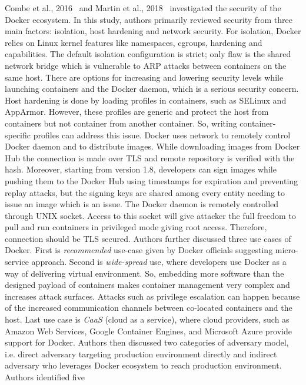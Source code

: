 Combe et al., 2016~\cite{combe2016docker} and Martin et al., 2018~\cite{martin2018docker} 
investigated the security of
the Docker ecosystem. In this study, authors primarily reviewed security
from three main factors: isolation, host hardening and network security. 
For isolation, 
Docker relies on Linux kernel features like namespaces, cgroups, 
hardening and capabilities. The default isolation configuration 
is strict; only flaw is the shared network bridge which is 
vulnerable to ARP attacks between containers on the same host. 
There are options for increasing and lowering security levels 
while launching containers and the Docker daemon, 
which is a serious security concern. Host hardening is done by 
loading profiles in containers, such as SELinux and AppArmor. 
However, these profiles are generic and protect the 
host from containers but not container from another container. So, writing 
container-specific profiles can address this issue. Docker uses network 
to remotely control Docker daemon and to distribute images. 
While downloading images from Docker Hub the connection is made over TLS 
and remote repository is verified with the hash. Moreover, starting from version 
1.8, developers can sign images while pushing them to the Docker Hub using 
timestamps for expiration and preventing replay attacks, but the signing keys 
are shared among every entity needing to issue an image which is an issue. 
The Docker daemon is remotely controlled through UNIX socket. Access to this 
socket will give attacker the full freedom to pull and run containers in 
privileged mode giving root access. Therefore, connection should be 
TLS secured.
Authors further discussed three use cases of Docker. First is \textit{recommended} 
use-case given by Docker officials suggesting micro-service approach. Second 
is \textit{wide-spread} use, where developers use Docker as a way of delivering virtual 
environment. So, embedding more software than the designed payload of containers 
makes container management very complex and increases attack surfaces. Attacks such as 
privilege escalation can happen because of the increased communication 
channels between co-located containers and the host. Last use case is \textit{CaaS} (cloud as a 
service), where cloud providers, such as Amazon Web Services, Google Container
Engines, and Microsoft Azure provide support for Docker. 
Authors then discussed two categories of adversary model, i.e. direct adversary 
targeting production environment directly and indirect adversary who leverages 
Docker ecosystem to reach production environment. Authors identified five 
